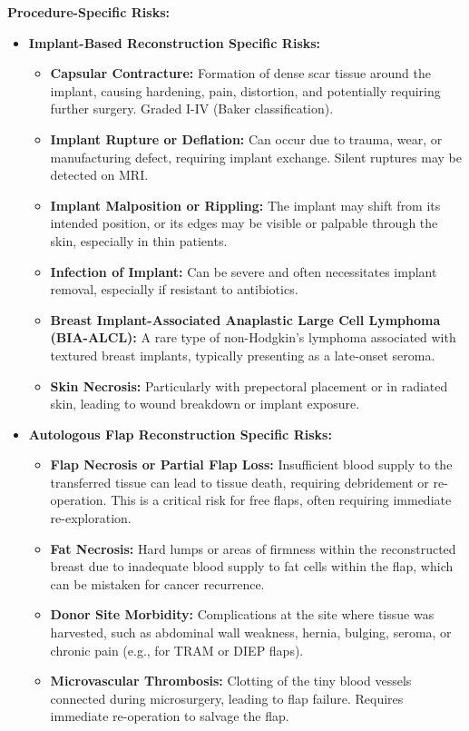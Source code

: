 \textbf{Procedure-Specific Risks:}
\begin{itemize}
  \item \textbf{Implant-Based Reconstruction Specific Risks:}
    \begin{itemize}
      \item \textbf{Capsular Contracture:} Formation of dense scar tissue around the implant, causing hardening, pain, distortion, and potentially requiring further surgery. Graded I-IV (Baker classification).
      \item \textbf{Implant Rupture or Deflation:} Can occur due to trauma, wear, or manufacturing defect, requiring implant exchange. Silent ruptures may be detected on MRI.
      \item \textbf{Implant Malposition or Rippling:} The implant may shift from its intended position, or its edges may be visible or palpable through the skin, especially in thin patients.
      \item \textbf{Infection of Implant:} Can be severe and often necessitates implant removal, especially if resistant to antibiotics.
      \item \textbf{Breast Implant-Associated Anaplastic Large Cell Lymphoma (BIA-ALCL):} A rare type of non-Hodgkin's lymphoma associated with textured breast implants, typically presenting as a late-onset seroma.
      \item \textbf{Skin Necrosis:} Particularly with prepectoral placement or in radiated skin, leading to wound breakdown or implant exposure.
    \end{itemize}
  \item \textbf{Autologous Flap Reconstruction Specific Risks:}
    \begin{itemize}
      \item \textbf{Flap Necrosis or Partial Flap Loss:} Insufficient blood supply to the transferred tissue can lead to tissue death, requiring debridement or re-operation. This is a critical risk for free flaps, often requiring immediate re-exploration.
      \item \textbf{Fat Necrosis:} Hard lumps or areas of firmness within the reconstructed breast due to inadequate blood supply to fat cells within the flap, which can be mistaken for cancer recurrence.
      \item \textbf{Donor Site Morbidity:} Complications at the site where tissue was harvested, such as abdominal wall weakness, hernia, bulging, seroma, or chronic pain (e.g., for TRAM or DIEP flaps).
      \item \textbf{Microvascular Thrombosis:} Clotting of the tiny blood vessels connected during microsurgery, leading to flap failure. Requires immediate re-operation to salvage the flap.

\end{itemize}
\end{itemize}
